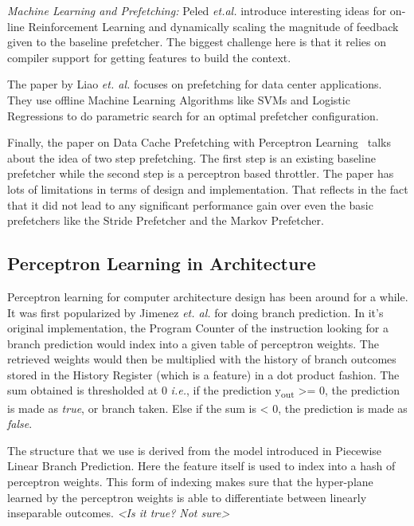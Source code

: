 \textit{Machine Learning and Prefetching:} Peled \textit{et.al.}
introduce interesting ideas for on-line Reinforcement Learning and
dynamically scaling the magnitude of feedback given to the baseline
prefetcher.  \cite{Semantics} The biggest challenge here is that it
relies on compiler support for getting features to build the context.

The paper by Liao \textit{et. al.} focuses on prefetching for data
center applications.  \cite{Datacenter} They use offline Machine
Learning Algorithms like SVMs and Logistic Regressions to do
parametric search for an optimal prefetcher configuration.

Finally, the paper on Data Cache Prefetching with Perceptron
Learning~\cite{BadPerc} talks about the idea of two step prefetching.
The first step is an existing baseline prefetcher while the second
step is a perceptron based throttler.  The paper has lots of
limitations in terms of design and implementation.  That reflects in
the fact that it did not lead to any significant performance gain over
even the basic prefetchers like the Stride Prefetcher\cite{Stride} and
the Markov Prefetcher\cite{Markov}.


\subsection{Perceptron Learning in Architecture}

Perceptron learning for computer architecture design has been around
for a while.  It was first popularized by Jimenez \textit{et. al.} for
doing branch prediction. \cite{Perc_Branch} In it's original
implementation, the Program Counter of the instruction looking for a
branch prediction would index into a given table of perceptron
weights.  The retrieved weights would then be multiplied with the
history of branch outcomes stored in the History Register (which is a
feature) in a dot product fashion.  The sum obtained is thresholded at
0 \textit{i.e.}, if the prediction y\textsubscript{out} >= 0, the
prediction is made as \textit{true}, or branch taken.  Else if the sum
is < 0, the prediction is made as \textit{false}.

The structure that we use is derived from the model introduced in
Piecewise Linear Branch Prediction\cite{Piece_Linear}.  Here the
feature itself is used to index into a hash of perceptron weights.
This form of indexing makes sure that the hyper-plane learned by the
perceptron weights is able to differentiate between linearly
inseparable outcomes.  \textit{<Is it true? Not sure>}

